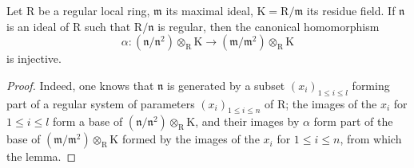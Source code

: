 \begin{lemma}[22.7.2.4]
\label{0.22.7.2.4}
Let $\mathrm{R}$ be a regular local ring, $\mathfrak{m}$ its maximal ideal, $\mathrm{K}=\mathrm{R}/\mathfrak{m}$ its residue field.
If $\mathfrak{n}$ is an ideal of $\mathrm{R}$ such that $\mathrm{R}/\mathfrak{n}$ is regular, then the canonical homomorphism
\[
\label{0.22.7.2.5}
  \alpha:(\mathfrak{n}/\mathfrak{n}^2)\otimes_\mathrm{R}\mathrm{K}\to(\mathfrak{m}/\mathfrak{m}^2)\otimes_\mathrm{R}\mathrm{K}
  \tag{22.7.2.5}
\]
is injective.
\end{lemma}

\begin{proof}
Indeed, one knows  that $\mathfrak{n}$ is generated by a subset $(x_i)_{1\leq i\leq l}$ forming part of a regular system of parameters $(x_i)_{1\leq i\leq n}$ of $\mathrm{R}$; the images of the $x_i$ for $1\leq i\leq l$ form a base of $(\mathfrak{n}/\mathfrak{n}^2)\otimes_\mathrm{R}\mathrm{K}$, and their images by $\alpha$ form part of the base of $(\mathfrak{m}/\mathfrak{m}^2)\otimes_\mathrm{R}\mathrm{K}$ formed by the images of the $x_i$ for $1\leq i\leq n$, from which the lemma.
\end{proof}

